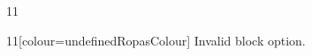 \documentclass[paper=A4]{ropas-poster}
\begin{document}
\begin{postergrid}{1}{1}
\begin{posterblock}{1}{1}[colour=undefinedRopasColour]
Invalid block option.
\end{posterblock}
\end{postergrid}
\end{document}
